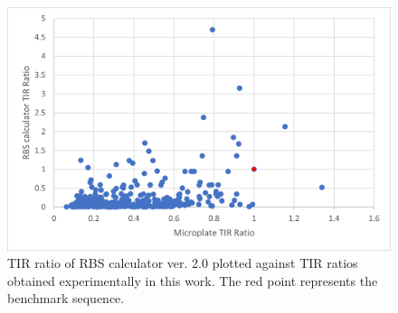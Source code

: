 \begin{figure}
    \centering
    \includegraphics[scale = 0.6]{paper/plots/Supplementary/TIR_ratio_salis_micro.png}
    \caption{TIR ratio of RBS calculator ver. 2.0 \cite{Salis2009} plotted against TIR ratios obtained experimentally in this work. The red point represents the benchmark sequence.}
    \label{fig:TIR ratio salis micro}
\end{figure}


